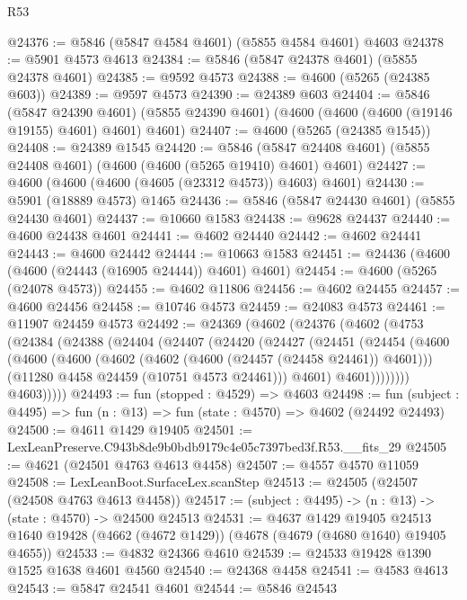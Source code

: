 \begin{lexlean}{R53}
\begin{coremodule}
@24376 := @5846 (@5847 @4584 @4601) (@5855 @4584 @4601) @4603
@24378 := @5901 @4573 @4613
@24384 := @5846 (@5847 @24378 @4601) (@5855 @24378 @4601)
@24385 := @9592 @4573
@24388 := @4600 (@5265 (@24385 @603))
@24389 := @9597 @4573
@24390 := @24389 @603
@24404 := @5846
    (@5847 @24390 @4601)
    (@5855 @24390 @4601)
    (@4600 (@4600 (@4600 (@19146 @19155) @4601) @4601) @4601)
@24407 := @4600 (@5265 (@24385 @1545))
@24408 := @24389 @1545
@24420 := @5846 (@5847 @24408 @4601) (@5855 @24408 @4601) (@4600 (@4600 (@5265 @19410) @4601) @4601)
@24427 := @4600 (@4600 (@4600 (@4605 (@23312 @4573)) @4603) @4601)
@24430 := @5901 (@18889 @4573) @1465
@24436 := @5846 (@5847 @24430 @4601) (@5855 @24430 @4601)
@24437 := @10660 @1583
@24438 := @9628 @24437
@24440 := @4600 @24438 @4601
@24441 := @4602 @24440
@24442 := @4602 @24441
@24443 := @4600 @24442
@24444 := @10663 @1583
@24451 := @24436 (@4600 (@4600 (@24443 (@16905 @24444)) @4601) @4601)
@24454 := @4600 (@5265 (@24078 @4573))
@24455 := @4602 @11806
@24456 := @4602 @24455
@24457 := @4600 @24456
@24458 := @10746 @4573
@24459 := @24083 @4573
@24461 := @11907 @24459 @4573
@24492 := @24369
    (@4602
      (@24376
        (@4602
          (@4753
            (@24384
              (@24388
                (@24404
                  (@24407
                    (@24420
                      (@24427
                        (@24451
                          (@24454
                            (@4600
                              (@4600
                                (@4600
                                  (@4602 (@4602 (@4600 (@24457 (@24458 @24461)) @4601)))
                                  (@11280 @4458 @24459 (@10751 @4573 @24461)))
                                @4601)
                              @4601))))))))
              @4603)))))
@24493 := fun (stopped : @4529) => @4603
@24498 := fun (subject : @4495) => fun (n : @13) => fun (state : @4570) => @4602 (@24492 @24493)
@24500 := @4611 @1429 @19405
@24501 := LexLeanPreserve.C943b8de9b0bdb9179c4e05c7397bed3f.R53.__fits_29
@24505 := @4621 (@24501 @4763 @4613 @4458)
@24507 := @4557 @4570 @11059
@24508 := LexLeanBoot.SurfaceLex.scanStep
@24513 := @24505 (@24507 (@24508 @4763 @4613 @4458))
@24517 := (subject : @4495) -> (n : @13) -> (state : @4570) -> @24500 @24513
@24531 := @4637
    @1429
    @19405
    @24513
    @1640
    @19428
    (@4662 (@4672 @1429))
    (@4678 (@4679 (@4680 @1640) @19405 @4655))
@24533 := @4832 @24366 @4610
@24539 := @24533 @19428 @1390 @1525 @1638 @4601 @4560
@24540 := @24368 @4458
@24541 := @4583 @4613
@24543 := @5847 @24541 @4601
@24544 := @5846 @24543

\end{coremodule}
\end{lexlean}
